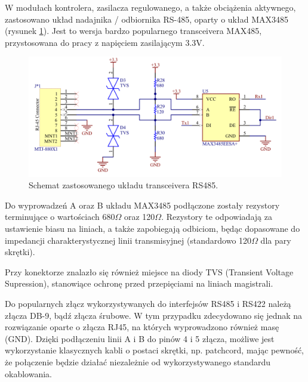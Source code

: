 W modułach kontrolera, zasilacza regulowanego, a także obciążenia aktywnego, zastosowano układ nadajnika / odbiornika RS-485, oparty o układ MAX3485 (rysunek  \ref{fig:schematRS485}). Jest to wersja 
bardzo popularnego transceivera MAX485, przystosowana do pracy z napięciem zasilającym 3.3V.

\begin{figure}[h!]
    \begin{center}
        \includegraphics[width = 17cm]{images/schematrs485_3.png}
        \caption{Schemat zastosowanego układu transceivera RS485.}
        \label{fig:schematRS485}
    \end{center}
\end{figure}

Do wyprowadzeń A oraz B układu MAX3485 \cite{MAX3485} podłączone zostały rezystory terminujące o wartościach 680$\Omega$ oraz 120$\Omega$.
Rezystory te odpowiadają za ustawienie biasu na liniach, a także zapobiegają odbiciom, będąc dopasowane do impedancji charakterystycznej linii transmisyjnej (standardowo 120$\Omega$ dla pary skrętki).

Przy konektorze znalazło się również miejsce na diody TVS (Transient Voltage Supression), stanowiące ochronę przed przepięciami na liniach magistrali.

Do popularnych złącz wykorzystywanych do interfejsów RS485 i RS422 należą złącza DB-9, bądź złącza śrubowe. W tym przypadku zdecydowano się jednak 
na rozwiązanie oparte o złącza RJ45, na których wyprowadzono również masę (GND). Dzięki podłączeniu linii A i B do pinów 4 i 5 złącza, możliwe jest wykorzystanie klasycznych kabli 
o postaci skrętki, np. patchcord, mając pewność, że połączenie będzie działać niezależnie od wykorzystywanego standardu okablowania.

